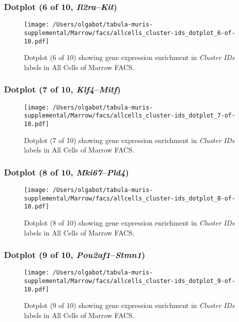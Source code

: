 \clearpage

\subsubsection{Dotplot (6 of 10, \emph{Il2ra}--\emph{Kit})}
\begin{figure}[h]
\centering
\texttt{[image: /Users/olgabot/tabula-muris-supplemental/Marrow/facs/allcells\_cluster-ids\_dotplot\_6-of-10.pdf]}

\caption{ Dotplot (6 of 10)  showing gene expression enrichment in \emph{Cluster IDs} labels in All Cells of Marrow FACS. }
\end{figure}


\clearpage

\subsubsection{Dotplot (7 of 10, \emph{Klf4}--\emph{Mitf})}
\begin{figure}[h]
\centering
\texttt{[image: /Users/olgabot/tabula-muris-supplemental/Marrow/facs/allcells\_cluster-ids\_dotplot\_7-of-10.pdf]}

\caption{ Dotplot (7 of 10)  showing gene expression enrichment in \emph{Cluster IDs} labels in All Cells of Marrow FACS. }
\end{figure}


\clearpage

\subsubsection{Dotplot (8 of 10, \emph{Mki67}--\emph{Pld4})}
\begin{figure}[h]
\centering
\texttt{[image: /Users/olgabot/tabula-muris-supplemental/Marrow/facs/allcells\_cluster-ids\_dotplot\_8-of-10.pdf]}

\caption{ Dotplot (8 of 10)  showing gene expression enrichment in \emph{Cluster IDs} labels in All Cells of Marrow FACS. }
\end{figure}


\clearpage

\subsubsection{Dotplot (9 of 10, \emph{Pou2af1}--\emph{Stmn1})}
\begin{figure}[h]
\centering
\texttt{[image: /Users/olgabot/tabula-muris-supplemental/Marrow/facs/allcells\_cluster-ids\_dotplot\_9-of-10.pdf]}

\caption{ Dotplot (9 of 10)  showing gene expression enrichment in \emph{Cluster IDs} labels in All Cells of Marrow FACS. }
\end{figure}


